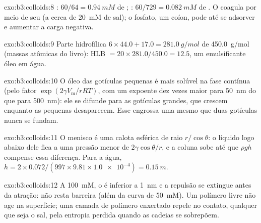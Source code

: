 \begin{solution}{exo:b3:colloids:8}
: $60/64 = \qty{0.94}{mM}$ de ; : $60/729 = \qty{0.082}{mM}$ de . O 
coagula por meio de seu  (a cerca de \qty{20}{mM} de sal); o fosfato, um coíon,
pode até se adsorver e aumentar a carga negativa.
\end{solution}

\begin{solution}{exo:b3:colloids:9}
Parte hidrofílica $6 \times 44.0 + 17.0 = \qty{281.0}{g/mol}$ de \qty{450.0}{g/mol} (massas atômicas do livro):
HLB $= 20 \times 281.0/450.0 = 12.5$, um emulsificante óleo em água.
\end{solution}

\begin{solution}{exo:b3:colloids:10}
O óleo das gotículas pequenas é mais solúvel na fase contínua (pelo fator
$\exp(2\gamma V_{\mathrm m}/rRT)$, com um expoente dez vezes maior para \qty{50}{nm} do que para \qty{500}{nm}): ele
se difunde para as gotículas grandes, que crescem enquanto as pequenas desaparecem.
Esse  engrossa uma  mesmo que duas gotículas nunca se fundam.
\end{solution}

\begin{solution}{exo:b3:colloids:11}
O menisco é uma calota esférica de raio $r/\cos\theta$: o líquido logo abaixo dele fica a uma
pressão menor de $2\gamma\cos\theta/r$, e a coluna sobe até que $\rho gh$ compense essa diferença. Para a água,
$h = 2 \times 0.072/(997 \times 9.81 \times \num{1.0e-4}) = \qty{0.15}{m}$.
\end{solution}

\begin{solution}{exo:b3:colloids:12}
A \qty{100}{mM}, o  é inferior a \qty{1}{nm} e a repulsão se extingue antes
da atração: não resta barreira (além da curva de \qty{50}{mM}). Um polímero livre não age
na superfície; uma camada de polímero enxertado repele no contato, qualquer que seja o
sal, pela entropia perdida quando as cadeias se sobrepõem.
\end{solution}

